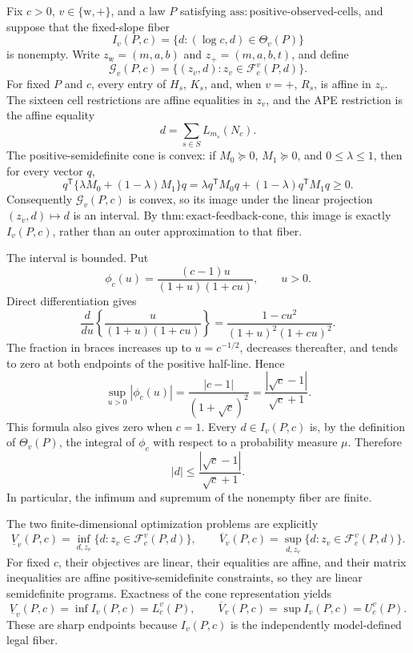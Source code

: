 Fix \(c>0\), \(v\in\{\mathrm w,+\}\), and a law \(P\) satisfying \(\mathrm{ass{:}positive\text{-}observed\text{-}cells}\), and suppose that the fixed-slope fiber
\[
 I_v(P,c)=\{d:(\log c,d)\in\Theta_v(P)\}
\]
is nonempty.  Write \(z_{\mathrm w}=(m,a,b)\) and \(z_+=(m,a,b,t)\), and define
\[
 \mathcal G_v(P,c)=\{(z_v,d):z_v\in\mathcal F_c^v(P,d)\}.
\]
For fixed \(P\) and \(c\), every entry of \(H_s\), \(K_s\), and, when \(v=+\), \(R_s\), is affine in \(z_v\).  The sixteen cell restrictions are affine equalities in \(z_v\), and the APE restriction is the affine equality
\[
 d=\sum_{s\in S}L_{m_s}(N_c).
\]
The positive-semidefinite cone is convex: if \(M_0\succeq0\), \(M_1\succeq0\), and \(0\le\lambda\le1\), then for every vector \(q\),
\[
 q^{\mathsf T}\{\lambda M_0+(1-\lambda)M_1\}q
 =\lambda q^{\mathsf T}M_0q+(1-\lambda)q^{\mathsf T}M_1q\ge0.
\]
Consequently \(\mathcal G_v(P,c)\) is convex, so its image under the linear projection \((z_v,d)\mapsto d\) is an interval.  By \(\mathrm{thm{:}exact\text{-}feedback\text{-}cone}\), this image is exactly \(I_v(P,c)\), rather than an outer approximation to that fiber.

The interval is bounded.  Put
\[
 \phi_c(u)=\frac{(c-1)u}{(1+u)(1+cu)},\qquad u>0.
\]
Direct differentiation gives
\[
 \frac{d}{du}\left\{\frac{u}{(1+u)(1+cu)}\right\}
 =\frac{1-cu^2}{(1+u)^2(1+cu)^2}.
\]
The fraction in braces increases up to \(u=c^{-1/2}\), decreases thereafter, and tends to zero at both endpoints of the positive half-line.  Hence
\[
 \sup_{u>0}|\phi_c(u)|
 =\frac{|c-1|}{(1+\sqrt c)^2}
 =\frac{|\sqrt c-1|}{\sqrt c+1}.
\]
This formula also gives zero when \(c=1\).  Every \(d\in I_v(P,c)\) is, by the definition of \(\Theta_v(P)\), the integral of \(\phi_c\) with respect to a probability measure \(\mu\).  Therefore
\[
 |d|\le \frac{|\sqrt c-1|}{\sqrt c+1}.
\]
In particular, the infimum and supremum of the nonempty fiber are finite.

The two finite-dimensional optimization problems are explicitly
\[
 \underline V_v(P,c)=
 \inf_{d,z_v}\{d:z_v\in\mathcal F_c^v(P,d)\},
 \qquad
 \overline V_v(P,c)=
 \sup_{d,z_v}\{d:z_v\in\mathcal F_c^v(P,d)\}.
\]
For fixed \(c\), their objectives are linear, their equalities are affine, and their matrix inequalities are affine positive-semidefinite constraints, so they are linear semidefinite programs.  Exactness of the cone representation yields
\[
 \underline V_v(P,c)=\inf I_v(P,c)=L_c^v(P),
 \qquad
 \overline V_v(P,c)=\sup I_v(P,c)=U_c^v(P).
\]
These are sharp endpoints because \(I_v(P,c)\) is the independently model-defined legal fiber.

